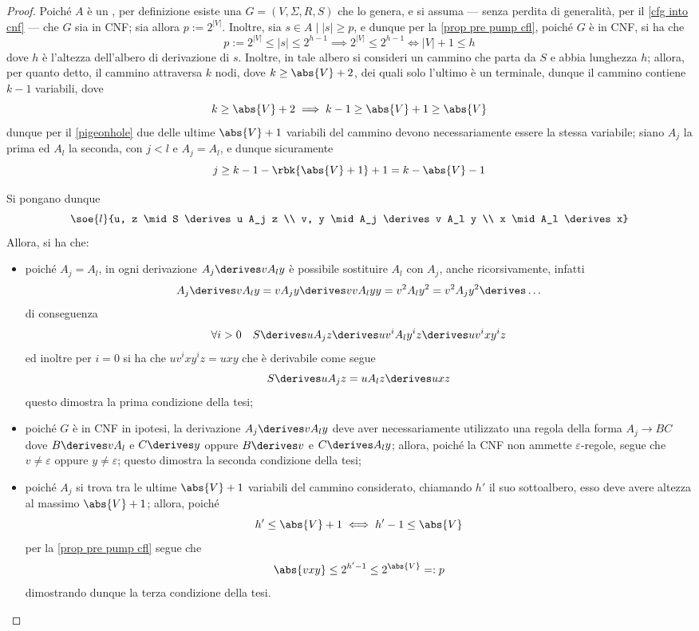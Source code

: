 \documentclass[a4paper, 12pt]{report}
\begin{document}
    \begin{proof}
        Poiché $A$ è un \CFL, per definizione esiste una \CFG $G = (V, \Sigma, R, S)$ che lo genera, e si assuma --- senza perdita di generalità, per il \cref{cfg into cnf} --- che $G$ sia in CNF; sia allora $p := 2^{|V|}$. Inoltre, sia $s \in A \mid |s| \ge p$, e dunque per la \cref{prop pre pump cfl}, poiché $G$ è in CNF, si ha che $$p := 2^{|V|} \le |s| \le 2^{h - 1} \implies 2^{|V|} \le 2^{h - 1} \iff |V| + 1 \le h$$ dove $h$ è l'altezza dell'albero di derivazione di $s$. Inoltre, in tale albero si consideri un cammino che parta da $S$ e abbia lunghezza $h$; allora, per quanto detto, il cammino attraversa $k$ nodi, dove $k \ge \abs{V} + 2$, dei quali solo l'ultimo è un terminale, dunque il cammino contiene $k - 1$ variabili, dove $$k \ge \abs{V} + 2 \implies k - 1 \ge \abs{V} + 1 \ge \abs{V}$$ dunque per il \cref{pigeonhole} due delle ultime $\abs{V} + 1$ variabili del cammino devono necessariamente essere la stessa variabile; siano $A_j$ la prima ed $A_l$ la seconda, con $j < l$ e $A_j = A_l$, e dunque sicuramente $$j \ge k - 1 - \rbk{\abs{V} + 1} + 1 = k - \abs{V} - 1$$
        
        Si pongano dunque $$\soe{l}{u, z \mid S \derives u A_j z \\ v, y \mid A_j \derives v A_l y \\ x \mid A_l \derives x}$$ Allora, si ha che:

        \begin{itemize}
            \item poiché $A_j = A_l$, in ogni derivazione $A_j \derives vA_ly$ è possibile sostituire $A_l$ con $A_j$, anche ricorsivamente, infatti $$A_j \derives vA_l y = vA_jy \derives vvA_lyy = v^2A_ly^2 = v^2 A_j y^2 \derives \ldots$$ di conseguenza $$\forall i > 0 \quad S \derives uA_j z \derives uv^i A_l y^iz \derives u v^i x y^i z$$ ed inoltre per $i = 0$ si ha che $uv^i xy^i z = uxy$ che è derivabile come segue $$S \derives u A_j z = u A_l z \derives uxz$$ questo dimostra la prima condizione della tesi;
            \item poiché $G$ è in CNF in ipotesi, la derivazione $A_j \derives v A_l y$ deve aver necessariamente utilizzato una regola della forma $A_j \to BC$ dove $B \derives v A_l$ e $C \derives y$ oppure $B \derives v$ e $C \derives A_l y$; allora, poiché la CNF non ammette $\varepsilon$-regole, segue che $v \neq \varepsilon$ oppure $y \neq \varepsilon$; questo dimostra la seconda condizione della tesi;
            \item poiché $A_j$ si trova tra le ultime $\abs{V} + 1$ variabili del cammino considerato, chiamando $h'$ il suo sottoalbero, esso deve avere altezza al massimo $\abs{V} + 1$; allora, poiché $$h' \le \abs{V} + 1 \iff h' - 1 \le \abs{V}$$ per la \cref{prop pre pump cfl} segue che $$\abs{vxy} \le 2^{h' - 1} \le 2^{\abs{V}} =: p$$ dimostrando dunque la terza condizione della tesi.
        \end{itemize}
    \end{proof}
\end{document}
